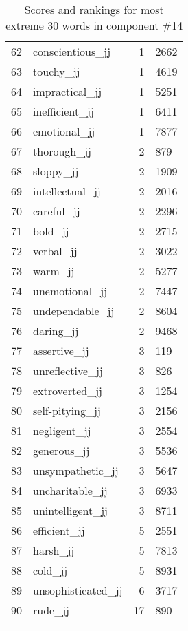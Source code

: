 \begin{longtable}[!htbp]{| rlr@{.}l |}
    62 & conscientious\_jj & 1 & 2662 \\
    63 & touchy\_jj & 1 & 4619 \\
    64 & impractical\_jj & 1 & 5251 \\
    65 & inefficient\_jj & 1 & 6411 \\
    66 & emotional\_jj & 1 & 7877 \\
    67 & thorough\_jj & 2 & 879 \\
    68 & sloppy\_jj & 2 & 1909 \\
    69 & intellectual\_jj & 2 & 2016 \\
    70 & careful\_jj & 2 & 2296 \\
    71 & bold\_jj & 2 & 2715 \\
    72 & verbal\_jj & 2 & 3022 \\
    73 & warm\_jj & 2 & 5277 \\
    74 & unemotional\_jj & 2 & 7447 \\
    75 & undependable\_jj & 2 & 8604 \\
    76 & daring\_jj & 2 & 9468 \\
    77 & assertive\_jj & 3 & 119 \\
    78 & unreflective\_jj & 3 & 826 \\
    79 & extroverted\_jj & 3 & 1254 \\
    80 & self-pitying\_jj & 3 & 2156 \\
    81 & negligent\_jj & 3 & 2554 \\
    82 & generous\_jj & 3 & 5536 \\
    83 & unsympathetic\_jj & 3 & 5647 \\
    84 & uncharitable\_jj & 3 & 6933 \\
    85 & unintelligent\_jj & 3 & 8711 \\
    86 & efficient\_jj & 5 & 2551 \\
    87 & harsh\_jj & 5 & 7813 \\
    88 & cold\_jj & 5 & 8931 \\
    89 & unsophisticated\_jj & 6 & 3717 \\
    90 & rude\_jj & 17 & 890 \\
    \hline
    \caption{Scores and rankings for most extreme 30 words in component \#14} \\
\end{longtable}
